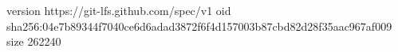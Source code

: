 version https://git-lfs.github.com/spec/v1
oid sha256:04e7b89344f7040ce6d6adad3872f6f4d157003b87cbd82d28f35aac967af009
size 262240
